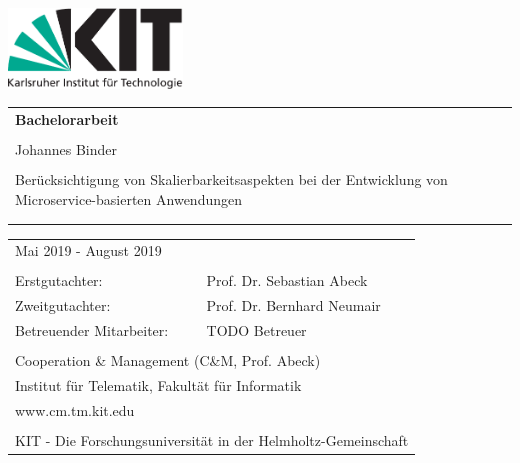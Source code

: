\begin{titlepage}
\thispagestyle{empty}
\enlargethispage{2cm}

\sffamily
\vspace*{-3.2cm}
\hspace*{-0.6cm}
\includegraphics[height=2.14cm]{images/kit-logo}

\begin{addmargin}{4cm}

\vfill

\begin{tabular}{p{12cm}}
	{\bfseries\huge Bachelorarbeit}\\
	\\
	{Johannes Binder} \vspace{2em} \\
	\\
	{\Huge Berücksichtigung von Skalierbarkeitsaspekten bei der Entwicklung von Microservice-basierten Anwendungen}  \vspace{0.5em}\\
	{\LARGE } \vspace{0.5em} \\
	{\LARGE }
\end{tabular}
\vfill
\vfill
\vfill



\vspace{1em}
\begin{tabular}{ll}
	

	Mai 2019 - August 2019 \\
	\\
	Erstgutachter: 				& Prof. Dr. Sebastian Abeck \\
	Zweitgutachter:				& Prof. Dr. Bernhard Neumair \\
	Betreuender Mitarbeiter:	& TODO Betreuer \\
	\\
	\multicolumn{2}{l}{Cooperation \& Management (C\&M, Prof. Abeck)} \\
	\multicolumn{2}{l}{Institut für Telematik, Fakultät für Informatik} \\
	\multicolumn{2}{l}{www.cm.tm.kit.edu} \\
	\\
	\multicolumn{2}{l}{\scriptsize{KIT - Die Forschungsuniversität in der Helmholtz-Gemeinschaft}}\\
\end{tabular}

\end{addmargin}
\newpage
\thispagestyle{empty}
\end{titlepage}